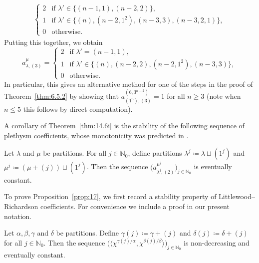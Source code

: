 \documentclass[ALCO, Unicode]{cedram}
\newcommand{\N}{\mathbb{N}}
\begin{document}
\begin{example}
\begin{align*}
\begin{cases}
			2 & \text{if }\lambda'\in\{(n-1,1),(n-2,2)\},\\
			1 & \text{if }\lambda'\in\{(n),(n-2,1^2),(n-3,3),(n-3,2,1)\},\\
			0 & \text{otherwise}.
		\end{cases}
	\end{align*}
	Putting this together, we obtain
	\[ a^\mu_{\lambda,(3)} = \begin{cases}
		2 & \text{if }\lambda'=(n-1,1),\\
		1 & \text{if }\lambda'\in\{(n),(n-2,2),(n-2,1^2),(n-3,3)\},\\
		0 & \text{otherwise}.
	\end{cases} \]
	In particular, this gives an alternative method for one of the steps in the proof of Theorem~\ref{thm:6.5.2} by showing that $a^{(6,3^{n-2})}_{(1^n),(3)}=1$ for all $n\ge 3$ (note when $n\le 5$ this follows by direct computation).%
\end{example}

A corollary of Theorem~\ref{thm:14.6i} is the stability of the following sequence of plethysm coefficients, whose monotonicity was predicted in \cite[Conjecture 1.2]{BBP}.

\begin{proposition}\label{prop:17}
	Let $\lambda$ and $\mu$ be partitions. For all $j\in\N_0$, define partitions $\lambda^j\coloneqq \lambda\sqcup(1^j)$ and $\mu^j\coloneqq (\mu+(j))\sqcup(1^j)$. Then the sequence $\big(a^{\mu^j}_{\lambda^j,(2)}\big)_{j\in\N_0}$ is eventually constant.
\end{proposition}

To prove Proposition~\ref{prop:17}, we first record a stability property of Littlewood--Richardson coefficients. For convenience we include a proof in our present notation.
\begin{lemma}\label{lem:lr-stab}
	Let $\alpha,\beta,\gamma$ and $\delta$ be partitions. Define $\gamma(j)\coloneqq \gamma+(j)$ and $\delta(j)\coloneqq \delta+(j)$ for all $j\in\N_0$. Then the sequence $\big( \langle\chi^{\gamma(j)/\alpha},\chi^{\delta(j)/\beta}\rangle \big)_{j\in\N_0}$ is non-decreasing and eventually constant.
\end{lemma}
\end{document}
